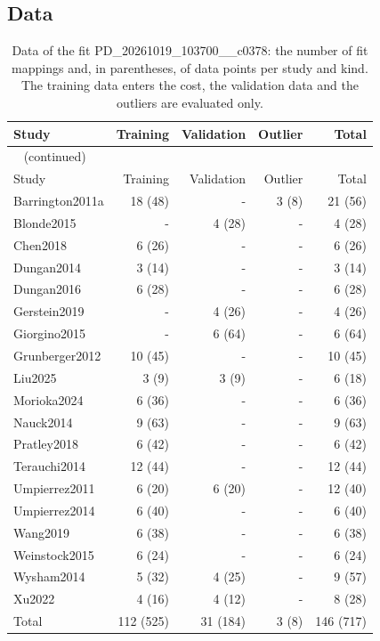 \subsection{Data}

\begin{longtable}{lrrrr}
\caption{Data of the fit PD\_20261019\_103700\_\_c0378: the number of fit mappings and, in parentheses, of data points per study and kind. The training data enters the cost, the validation data and the outliers are evaluated only.}\label{tab:data:PD_20261019_103700__c0378} \\
\toprule
Study & Training & Validation & Outlier & Total \\
\midrule
\endfirsthead
\multicolumn{5}{l}{\small\tablename~\thetable{} (continued)} \\
\toprule
Study & Training & Validation & Outlier & Total \\
\midrule
\endhead
\bottomrule
\endlastfoot
Barrington2011a & 18 (48) & - & 3 (8) & 21 (56) \\
Blonde2015 & - & 4 (28) & - & 4 (28) \\
Chen2018 & 6 (26) & - & - & 6 (26) \\
Dungan2014 & 3 (14) & - & - & 3 (14) \\
Dungan2016 & 6 (28) & - & - & 6 (28) \\
Gerstein2019 & - & 4 (26) & - & 4 (26) \\
Giorgino2015 & - & 6 (64) & - & 6 (64) \\
Grunberger2012 & 10 (45) & - & - & 10 (45) \\
Liu2025 & 3 (9) & 3 (9) & - & 6 (18) \\
Morioka2024 & 6 (36) & - & - & 6 (36) \\
Nauck2014 & 9 (63) & - & - & 9 (63) \\
Pratley2018 & 6 (42) & - & - & 6 (42) \\
Terauchi2014 & 12 (44) & - & - & 12 (44) \\
Umpierrez2011 & 6 (20) & 6 (20) & - & 12 (40) \\
Umpierrez2014 & 6 (40) & - & - & 6 (40) \\
Wang2019 & 6 (38) & - & - & 6 (38) \\
Weinstock2015 & 6 (24) & - & - & 6 (24) \\
Wysham2014 & 5 (32) & 4 (25) & - & 9 (57) \\
Xu2022 & 4 (16) & 4 (12) & - & 8 (28) \\
Total & 112 (525) & 31 (184) & 3 (8) & 146 (717) \\
\end{longtable}

